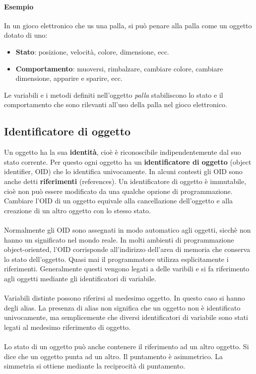 \documentclass{article}
\begin{document}
	\paragraph{Esempio}
	In un gioco elettronico che us una palla, si può penare alla palla come un oggetto dotato di uno:
	\begin{itemize}
		\item \textbf{Stato}: posizione, velocità, colore, dimensione, ecc.
		\item \textbf{Comportamento}: muoversi, rimbalzare, cambiare colore, cambiare dimensione, apparire e sparire, ecc.
	\end{itemize}
	Le variabili e i metodi definiti nell'oggetto \textit{palla} stabiliscono lo stato e il comportamento che sono rilevanti all'uso della palla nel gioco elettronico.

	\subsection{Identificatore di oggetto}
	Un oggetto ha la sua \textbf{identità}, cioè è riconoscibile indipendentemente dal suo stato corrente. Per questo ogni oggetto ha un \textbf{identificatore di oggetto} (object identifier, OID) che lo identifica univocamente. In alcuni contesti gli OID sono anche detti \textbf{riferimenti} (references).
	Un identificatore di oggetto è immutabile, cioè non può essere modificato da una qualche opzione di programmazione. Cambiare l'OID di un oggetto equivale alla cancellazione dell'oggetto e alla creazione di un altro oggetto con lo stesso stato.\\\\
	Normalmente gli OID sono assegnati in modo automatico agli oggetti, sicchè non hanno un significato nel mondo reale.
	In molti ambienti di programmazione object-oriented, l'OID corrisponde all'indirizzo dell'area di memoria che conserva lo stato dell'oggetto.
	Quasi mai il programmatore utilizza esplicitamente i riferimenti. Generalmente questi vengono legati a delle varibili e si fa riferimento agli oggetti mediante gli identificatori di variabile. \\\\
	Variabili distinte possono riferirsi al medesimo oggetto. In questo caso si hanno degli alias. La presenza di alias non significa che un oggetto non è identificato univocamente, ma semplicemente che diversi identificatori di variabile sono stati legati al medesimo riferimento di oggetto. \\\\
	Lo stato di un oggetto può anche contenere il riferimento ad un altro oggetto. Si dice che un oggetto punta ad un altro. Il puntamento è asimmetrico. La simmetria si ottiene mediante la reciprocità di puntamento.
\end{document}
